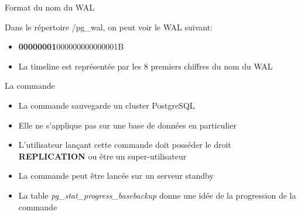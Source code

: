 
\begin{frame}[fragile]{Format du nom du WAL}

   Dans le répertoire /pg\_wal, on peut voir le WAL suivant:

\begin{itemize}

   \item \textbf{00000001}000000000000001B
   \item La timeline est représentée par les 8 premiers chiffres du nom du WAL

\end{itemize}

\begin{toile}
\end{toile}

\end{frame}



\begin{frame}[fragile]{La commande }

\begin{itemize}

\item La commande  sauvegarde un cluster PostgreSQL
\item Elle ne s'applique pas sur une base de données en particulier
\item L'utilisateur lançant cette commande doit posséder le droit \textbf{REPLICATION} ou être un super-utilisateur
\item La commande peut être lancée sur un serveur standby
\item La table \textit{pg\_stat\_progress\_basebackup} donne une idée de la progression de la commande

\end{itemize}

\begin{toile}
\end{toile}

\end{frame}

